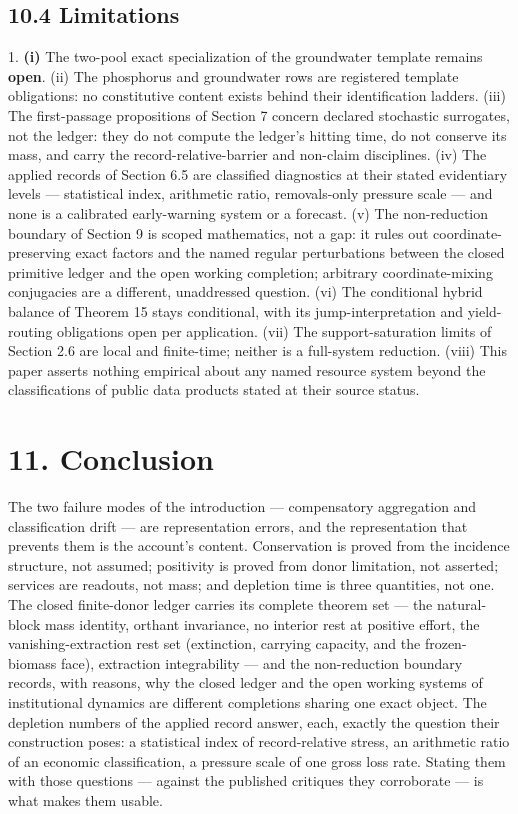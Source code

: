 \documentclass[11pt]{article}
\begin{document}
\subsection*{10.4 Limitations}\label{104-limitations}

1. \textbf{(i)} The two-pool exact specialization of the groundwater template remains \textbf{open}. (ii) The phosphorus and groundwater rows are registered template obligations: no constitutive content exists behind their identification ladders. (iii) The first-passage propositions of Section 7 concern declared stochastic surrogates, not the ledger: they do not compute the ledger's hitting time, do not conserve its mass, and carry the record-relative-barrier and non-claim disciplines. (iv) The applied records of Section 6.5 are classified diagnostics at their stated evidentiary levels --- statistical index, arithmetic ratio, removals-only pressure scale --- and none is a calibrated early-warning system or a forecast. (v) The non-reduction boundary of Section 9 is scoped mathematics, not a gap: it rules out coordinate-preserving exact factors and the named regular perturbations between the closed primitive ledger and the open working completion; arbitrary coordinate-mixing conjugacies are a different, unaddressed question. (vi) The conditional hybrid balance of Theorem 15 stays conditional, with its jump-interpretation and yield-routing obligations open per application. (vii) The support-saturation limits of Section 2.6 are local and finite-time; neither is a full-system reduction. (viii) This paper asserts nothing empirical about any named resource system beyond the classifications of public data products stated at their source status.

\vspace{0.8em}

\section*{11. Conclusion}\label{11-conclusion}

The two failure modes of the introduction --- compensatory aggregation and classification drift --- are representation errors, and the representation that prevents them is the account's content. Conservation is proved from the incidence structure, not assumed; positivity is proved from donor limitation, not asserted; services are readouts, not mass; and depletion time is three quantities, not one. The closed finite-donor ledger carries its complete theorem set --- the natural-block mass identity, orthant invariance, no interior rest at positive effort, the vanishing-extraction rest set (extinction, carrying capacity, and the frozen-biomass face), extraction integrability --- and the non-reduction boundary records, with reasons, why the closed ledger and the open working systems of institutional dynamics are different completions sharing one exact object. The depletion numbers of the applied record answer, each, exactly the question their construction poses: a statistical index of record-relative stress, an arithmetic ratio of an economic classification, a pressure scale of one gross loss rate. Stating them with those questions --- against the published critiques they corroborate --- is what makes them usable.
\end{document}
